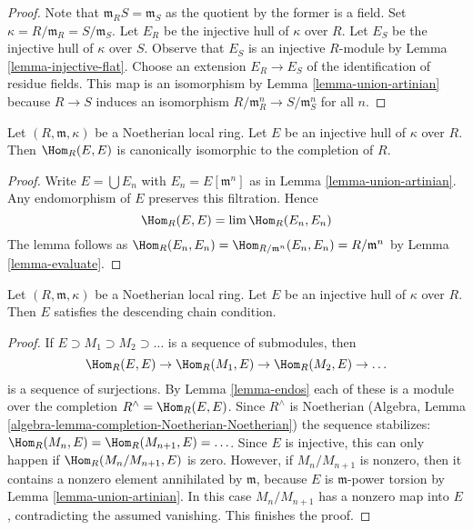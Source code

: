 \begin{proof}
Note that $\mathfrak m_RS = \mathfrak m_S$ as the quotient by the former
is a field. Set $\kappa = R/\mathfrak m_R = S/\mathfrak m_S$.
Let $E_R$ be the injective hull of $\kappa$ over $R$.
Let $E_S$ be the injective hull of $\kappa$ over $S$.
Observe that $E_S$ is an injective $R$-module by
Lemma \ref{lemma-injective-flat}.
Choose an extension $E_R \to E_S$ of the identification of
residue fields. This map is an isomorphism by
Lemma \ref{lemma-union-artinian}
because $R \to S$ induces an isomorphism
$R/\mathfrak m_R^n \to S/\mathfrak m_S^n$ for all $n$.
\end{proof}

\begin{lemma}
\label{lemma-endos}
Let $(R, \mathfrak m, \kappa)$ be a Noetherian local ring.
Let $E$ be an injective hull of $\kappa$ over $R$. Then
$\Hom_R(E, E)$ is canonically isomorphic to the completion of $R$.
\end{lemma}

\begin{proof}
Write $E = \bigcup E_n$ with $E_n = E[\mathfrak m^n]$ as in
Lemma \ref{lemma-union-artinian}. Any endomorphism of $E$
preserves this filtration. Hence
$$
\Hom_R(E, E) = \lim \Hom_R(E_n, E_n)
$$
The lemma follows as
$\Hom_R(E_n, E_n) = \Hom_{R/\mathfrak m^n}(E_n, E_n) = R/\mathfrak m^n$
by Lemma \ref{lemma-evaluate}.
\end{proof}

\begin{lemma}
\label{lemma-injective-hull-has-dcc}
Let $(R, \mathfrak m, \kappa)$ be a Noetherian local ring.
Let $E$ be an injective hull of $\kappa$ over $R$. Then
$E$ satisfies the descending chain condition.
\end{lemma}

\begin{proof}
If $E \supset M_1 \supset M_2 \supset \ldots$ is a sequence of submodules, then
$$
\Hom_R(E, E) \to \Hom_R(M_1, E) \to \Hom_R(M_2, E) \to \ldots
$$
is a sequence of surjections. By Lemma \ref{lemma-endos} each of these is a
module over the completion $R^\wedge = \Hom_R(E, E)$.
Since $R^\wedge$ is Noetherian
(Algebra, Lemma \ref{algebra-lemma-completion-Noetherian-Noetherian})
the sequence stabilizes: $\Hom_R(M_n, E) = \Hom_R(M_{n + 1}, E) = \ldots$.
Since $E$ is injective, this can only happen if $\Hom_R(M_n/M_{n + 1}, E)$
is zero. However, if $M_n/M_{n + 1}$ is nonzero, then it contains a
nonzero element annihilated by $\mathfrak m$, because $E$ is
$\mathfrak m$-power torsion by Lemma \ref{lemma-union-artinian}.
In this case $M_n/M_{n + 1}$ has a nonzero map into $E$, contradicting
the assumed vanishing. This finishes the proof.
\end{proof}

